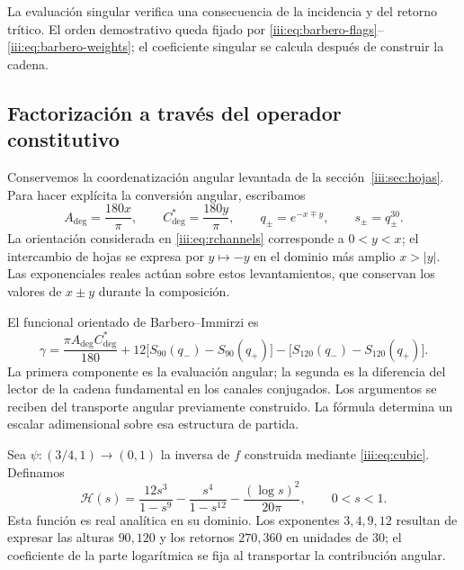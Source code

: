 La evaluación singular verifica una consecuencia de la incidencia y del
retorno trítico. El orden demostrativo queda fijado por
\eqref{iii:eq:barbero-flags}--\eqref{iii:eq:barbero-weights}; el
coeficiente singular se calcula después de construir la cadena.

\subsection{Factorización a través del operador constitutivo}

Conservemos la coordenatización angular levantada de la
sección~\ref{iii:sec:hojas}. Para hacer explícita la conversión angular,
escribamos
\begin{equation}
 A_{\deg}=\frac{180x}{\pi},\qquad
 C^*_{\deg}=\frac{180y}{\pi},\qquad
 q_\pm=e^{-x\mp y},\qquad s_\pm=q_\pm^{30}.
 \label{iii:eq:barbero-angular-lift}
\end{equation}
La orientación considerada en \eqref{iii:eq:rchannels} corresponde a
$0<y<x$; el intercambio de hojas se expresa por $y\mapsto-y$ en el
dominio más amplio $x>|y|$. Las exponenciales reales actúan sobre estos
levantamientos, que conservan los valores de $x\pm y$ durante la
composición.

El funcional orientado de Barbero--Immirzi es
\begin{equation}
 \gamma=\frac{\pi A_{\deg}C^*_{\deg}}{180}
   +12\bigl[S_{90}(q_-)-S_{90}(q_+)\bigr]
   -\bigl[S_{120}(q_-)-S_{120}(q_+)\bigr].
 \label{iii:eq:barbero-functional}
\end{equation}
La primera componente es la evaluación angular; la segunda es la
diferencia del lector de la cadena fundamental en los canales conjugados.
Los argumentos se reciben del transporte angular previamente construido.
La fórmula determina un escalar adimensional sobre esa estructura de
partida.

Sea $\psi:(3/4,1)\to(0,1)$ la inversa de $f$ construida mediante
\eqref{iii:eq:cubic}. Definamos
\begin{equation}
 \mathcal H(s)=\frac{12s^3}{1-s^9}
             -\frac{s^4}{1-s^{12}}
             -\frac{(\log s)^2}{20\pi},\qquad 0<s<1.
 \label{iii:eq:barbero-h}
\end{equation}
Esta función es real analítica en su dominio. Los exponentes $3,4,9,12$
resultan de expresar las alturas $90,120$ y los retornos $270,360$ en
unidades de $30$; el coeficiente de la parte logarítmica se fija al
transportar la contribución angular.

